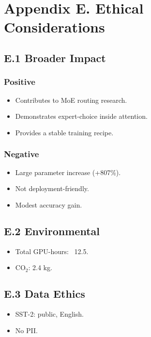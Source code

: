 \section{Appendix E. Ethical Considerations}

\subsection{E.1 Broader Impact}

\subsubsection{Positive}
\begin{itemize}
\item Contributes to MoE routing research.
\item Demonstrates expert-choice inside attention.
\item Provides a stable training recipe.

\end{itemize}
\subsubsection{Negative}
\begin{itemize}
\item Large parameter increase (+807\%).
\item Not deployment-friendly.
\item Modest accuracy gain.

\end{itemize}
\subsection{E.2 Environmental}

\begin{itemize}
\item Total GPU-hours: ~12.5.
\item CO$_2$: 2.4 kg.

\end{itemize}
\subsection{E.3 Data Ethics}

\begin{itemize}
\item SST-2: public, English.
\item No PII.

\end{itemize}
